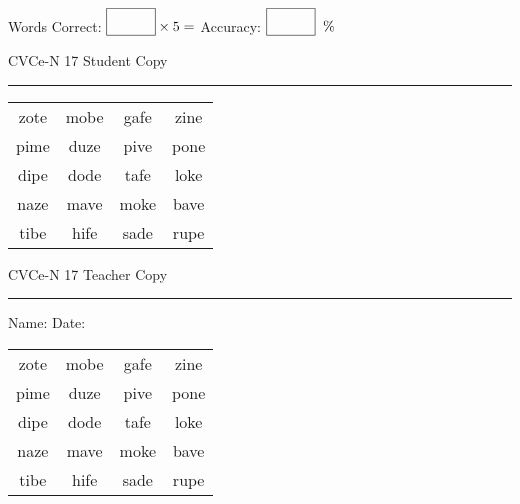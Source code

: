 \documentclass{memoir}
\begin{document}
\small

Words Correct: $\fbox{\phantom{\huge 100}} \times 5 = $ Accuracy: $\fbox{\phantom{\huge 100}}\;\; \%$ 

\vfill

\newpage


\footnotesize \noindent
CVCe-N 17 \hfill Student Copy
\smallskip
\hrule

\Large

\setlength{\tabcolsep}{14pt}
\def\arraystretch{2}

{\selectfont


\begin{vplace}[0.5]
\begin{center}
\begin{tabular}{cccc}
zote & mobe & gafe & zine \\
pime & duze & pive & pone \\
dipe & dode & tafe & loke \\
naze & mave & moke & bave \\
tibe & hife & sade & rupe \\
\end{tabular}
\end{center}
\end{vplace}

}

\newpage

\footnotesize \noindent
CVCe-N 17 \hfill Teacher Copy
\smallskip
\hrule

\small

\vfill

\noindent
Name: \underline{\hspace{1.75in}} \hfill Date: \underline{\hspace{1in}}

\Large

{\selectfont


\begin{vplace}[0.5]
\begin{center}
\begin{tabular}{cccc}
zote & mobe & gafe & zine \\
pime & duze & pive & pone \\
dipe & dode & tafe & loke \\
naze & mave & moke & bave \\
tibe & hife & sade & rupe \\
\end{tabular}
\end{center}
\end{vplace}



}
\end{document}
